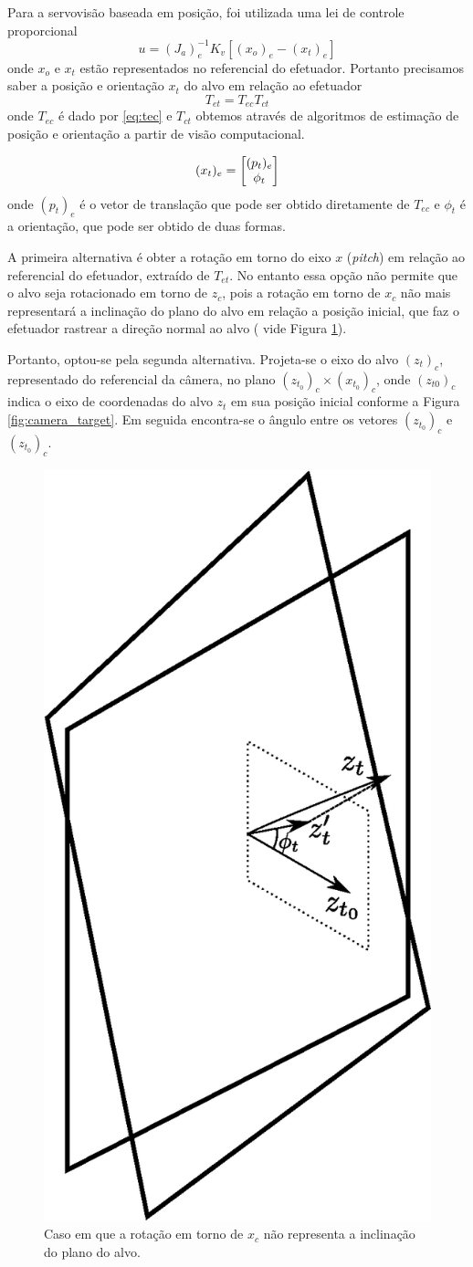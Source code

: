 Para a servovisão baseada em posição, foi utilizada uma lei de controle proporcional
\begin{equation} \label{eq:lei_posicao}
{u} = ({J}_a)_e^{-1}{K}_v[({x}_o)_e - ({x}_t)_e]
\end{equation}
onde ${x}_o$ e ${x_t}$ estão representados no referencial do efetuador. Portanto precisamos saber a posição e orientação ${x}_t$ do alvo em relação ao efetuador
\begin{equation}
{T}_{et} = {T}_{ec} {T}_{ct}
\end{equation}
onde ${T}_{ec}$ é dado por \eqref{eq:tec} e ${T}_{ct}$ obtemos através de algoritmos de estimação de posição e orientação a partir de visão computacional. 

\begin{equation}
({x}_t)_e = \begin{bmatrix} ({p}_t)_e \\ \phi_t \end{bmatrix}
\end{equation}
onde $({p}_t)_e$ é o vetor de translação que pode ser obtido diretamente de ${T}_{ec}$ e  $\phi_t$ é a orientação, que pode ser obtido de duas formas.


A primeira alternativa é obter a rotação em torno do eixo $x$ (\textit{pitch}) em relação ao referencial do efetuador, extraído de ${T}_{et}$. No entanto essa opção não permite que o alvo seja rotacionado em torno de ${z}_c$, pois a rotação em torno de ${x}_c$ não mais representará a inclinação do plano do alvo em relação a posição inicial, que faz o efetuador rastrear a direção normal ao alvo ( vide Figura \ref{fig:projection}). 

Portanto, optou-se pela segunda alternativa. Projeta-se o eixo do alvo $({z}_t)_c$, representado do referencial da câmera, no plano $({z}_{t_0})_c \times ({x}_{t_0})_c$, onde $({z}_{t0})_c$ indica o eixo de coordenadas do alvo $z_t$ em sua posição inicial conforme a Figura \ref{fig:camera_target}. Em seguida encontra-se o ângulo entre os vetores $({z}_{t_0})_c$ e $({z}_{t_0})_c$. 

\begin{figure}[!ht]
\centering
  \includegraphics[width=0.3\linewidth]{./img/projection.eps}
  \caption{Caso em que a rotação em torno de ${x}_c$ não representa a inclinação do plano do alvo.}
  \label{fig:projection}
\end{figure}%


